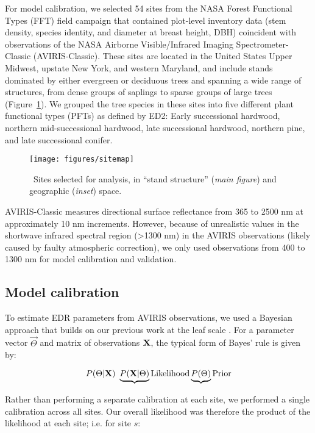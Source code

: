 For model calibration, we selected 54 sites from the NASA Forest Functional Types (FFT) field campaign that contained plot-level inventory data (stem density, species identity, and diameter at breast height, DBH) coincident with observations of the NASA Airborne Visible/Infrared Imaging Spectrometer-Classic (AVIRIS-Classic).
These sites are located in the United States Upper Midwest, upstate New York, and western Maryland, and include stands dominated by either evergreen or deciduous trees and spanning a wide range of structures, from dense groups of saplings to sparse groups of large trees (Figure~\ref{fig:sites}).
We grouped the tree species in these sites into five different plant functional types (PFTs) as defined by ED2:
Early successional hardwood, northern mid-successional hardwood, late successional hardwood, northern pine, and late successional conifer.

\begin{figure}
  \centering
  \texttt{[image: figures/sitemap]}
  \caption{\
    Sites selected for analysis, in ``stand structure'' (\textit{main figure}) and geographic (\textit{inset}) space.
  }\label{fig:sites}
\end{figure}

AVIRIS-Classic measures directional surface reflectance from 365 to 2500 \unit{nm} at approximately 10 \unit{nm} increments.
However, because of unrealistic values in the shortwave infrared spectral region (>1300 \unit{nm}) in the AVIRIS observations (likely caused by faulty atmospheric correction), we only used observations from 400 to 1300 \unit{nm} for model calibration and validation.

\subsection{Model calibration}

To estimate EDR parameters from AVIRIS observations, we used a Bayesian approach that builds on our previous work at the leaf scale \citep{shiklomanov2016quantifying}.
For a parameter vector $\vec{\Theta}$ and matrix of observations $\mathbf{X}$, the typical form of Bayes' rule is given by:

\begin{equation}
  P(\relax{\Theta} | \mathbf{X}) ~ \underbrace{P(\mathbf{X} | \relax{\Theta})}{\text{Likelihood}} \underbrace{P(\relax{\Theta})}{\text{Prior}}
\end{equation}

Rather than performing a separate calibration at each site, we performed a single calibration across all sites.
Our overall likelihood was therefore the product of the likelihood at each site; i.e. for site $s$:


